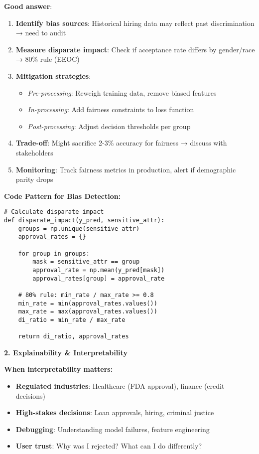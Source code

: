 \documentclass[10pt]{article}
\begin{document}
\textbf{Good answer}:
\begin{enumerate}
\item \textbf{Identify bias sources}: Historical hiring data may reflect past discrimination → need to audit
\item \textbf{Measure disparate impact}: Check if acceptance rate differs by gender/race → 80\% rule (EEOC)
\item \textbf{Mitigation strategies}:
\begin{itemize}
\item \textit{Pre-processing}: Reweigh training data, remove biased features
\item \textit{In-processing}: Add fairness constraints to loss function
\item \textit{Post-processing}: Adjust decision thresholds per group
\end{itemize}
\item \textbf{Trade-off}: Might sacrifice 2-3\% accuracy for fairness → discuss with stakeholders
\item \textbf{Monitoring}: Track fairness metrics in production, alert if demographic parity drops
\end{enumerate}

\textbf{Code Pattern for Bias Detection:}
\begin{verbatim}
# Calculate disparate impact
def disparate_impact(y_pred, sensitive_attr):
    groups = np.unique(sensitive_attr)
    approval_rates = {}

    for group in groups:
        mask = sensitive_attr == group
        approval_rate = np.mean(y_pred[mask])
        approval_rates[group] = approval_rate

    # 80% rule: min_rate / max_rate >= 0.8
    min_rate = min(approval_rates.values())
    max_rate = max(approval_rates.values())
    di_ratio = min_rate / max_rate

    return di_ratio, approval_rates
\end{verbatim}

\textbf{2. Explainability \& Interpretability}

\textbf{When interpretability matters:}
\begin{itemize}
\item \textbf{Regulated industries}: Healthcare (FDA approval), finance (credit decisions)
\item \textbf{High-stakes decisions}: Loan approvals, hiring, criminal justice
\item \textbf{Debugging}: Understanding model failures, feature engineering
\item \textbf{User trust}: Why was I rejected? What can I do differently?
\end{itemize}
\end{document}
